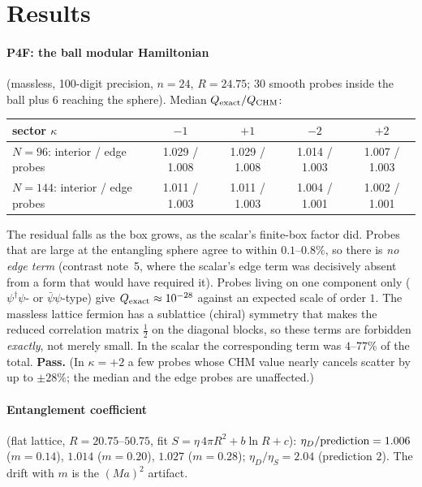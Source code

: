 \documentclass[11pt]{article}
\begin{document}
\section{Results}
\paragraph{P4F: the ball modular Hamiltonian} (massless, 100-digit precision, $n=24$, $R=24.75$; 30 smooth probes inside the ball plus 6 reaching the sphere). Median $Q_{\rm exact}/Q_{\rm CHM}$:
\begin{center}\small\begin{tabular}{lcccc}\toprule
sector $\kappa$ & $-1$ & $+1$ & $-2$ & $+2$\\\midrule
$N=96$: interior / edge probes & 1.029 / 1.008 & 1.029 / 1.008 & 1.014 / 1.003 & 1.007 / 1.003\\
$N=144$: interior / edge probes & 1.011 / 1.003 & 1.011 / 1.003 & 1.004 / 1.001 & 1.002 / 1.001\\\bottomrule\end{tabular}\end{center}
The residual falls as the box grows, as the scalar's finite-box factor did. Probes that are large at the entangling sphere agree to within $0.1$--$0.8\%$, so there is \emph{no edge term} (contrast note~5, where the scalar's edge term was decisively absent from a form that would have required it). Probes living on one component only ($\psi^\dagger\psi$- or $\bar\psi\psi$-type) give $Q_{\rm exact}\approx10^{-28}$ against an expected scale of order $1$. The massless lattice fermion has a sublattice (chiral) symmetry that makes the reduced correlation matrix $\tfrac12$ on the diagonal blocks, so these terms are forbidden \emph{exactly}, not merely small. In the scalar the corresponding term was $4$--$77\%$ of the total. \textbf{Pass.} (In $\kappa=+2$ a few probes whose CHM value nearly cancels scatter by up to $\pm28\%$; the median and the edge probes are unaffected.)

\paragraph{Entanglement coefficient} (flat lattice, $R=20.75$--$50.75$, fit $S=\eta\,4\pi R^2+b\ln R+c$):
$\eta_D/{\rm prediction}=1.006$ ($m=0.14$), $1.014$ ($m=0.20$), $1.027$ ($m=0.28$); $\eta_D/\eta_S=2.04$ (prediction $2$). The drift with $m$ is the $(Ma)^2$ artifact.
\end{document}
